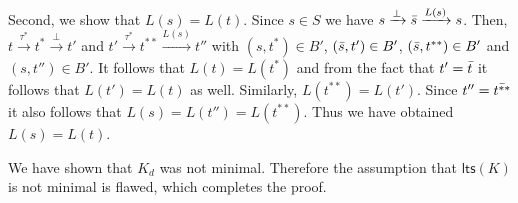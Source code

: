 \documentclass{llncs}
\newcommand{\ltstrans}[1]{\xrightarrow{#1}}
\newcommand{\lts}{\mathsf{lts}}
\begin{document}
Second, we show that $L(s) = L(t)$. Since $s \in S$ we have $s \ltstrans{\bot} \shadow{s} \ltstrans{L(s)} s$. Then, $t \ltstrans{\tau^*} t^* \ltstrans{\bot} t'$ and $t'\ltstrans{\tau^*} t^{**} \ltstrans{L(s)} t''$ with $(s,t^*) \in B'$, $(\bar{s},t') \in B'$, $(\bar{s},t^{**})\in B'$ and $(s,t'') \in B'$.
It follows that $L(t) = L(t^*)$ and from the fact that $t'=\bar{t}$ it follows that $L(t') = L(t)$ as well. Similarly, $L(t^{**}) = L(t')$. Since $t''=\bar{t^{**}}$ it also follows that $L(s) = L(t'') = L(t^{**})$. Thus we have obtained $L(s)=L(t)$.

We have shown that $K_d$ was not minimal. Therefore the assumption that $\lts(K)$ is not minimal is flawed, which completes the proof.
\end{document}

